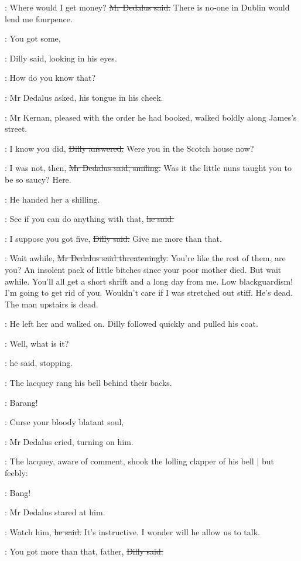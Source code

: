 \simon:
Where would I get money?
\sout{Mr Dedalus said.}
There is no-one in Dublin would lend me fourpence.%

\dilly:
You got some,

:
Dilly said,
looking in his eyes.

\simon:
How do you know that?

:
Mr Dedalus asked,
his tongue in his cheek.

:
Mr Kernan,
pleased with the order he had booked,
walked boldly along James's street.

\dilly:
I know you did,
\sout{Dilly answered.}
Were you in the Scotch house now?

\simon:
I was not, then,
\sout{Mr Dedalus said, smiling.}
Was it the little nuns taught you to be so saucy?
Here.

:
He handed her a shilling.

\simon:
See if you can do anything with that,
\sout{he said.}

\dilly:
I suppose you got five,
\sout{Dilly said.}
Give me more than that.

\simon:
Wait awhile,
\sout{Mr Dedalus said threateningly.}
You're like the rest of them, are you?
An insolent pack of little bitches since your poor mother died.
But wait awhile.
You'll all get a short shrift and a long day from me.
Low blackguardism!
I'm going to get rid of you.
Wouldn't care if I was stretched out stiff.
He's dead.
The man upstairs is dead.

:
He left her and walked on.
Dilly followed quickly and pulled his coat.

\simon:
Well, what is it?

:
he said, stopping.

:
The lacquey rang his bell behind their backs.

\bell:
Barang!

\simon:
Curse your bloody blatant soul,

:
Mr Dedalus cried,
turning on him.

:
The lacquey,
aware of comment,
shook the lolling clapper of his bell |
but feebly:

\bell:
Bang!

:
Mr Dedalus stared at him.

\simon:
Watch him,
\sout{he said.}
It's instructive.
I wonder will he allow us to talk.

\dilly:
You got more than that, father,
\sout{Dilly said.}

